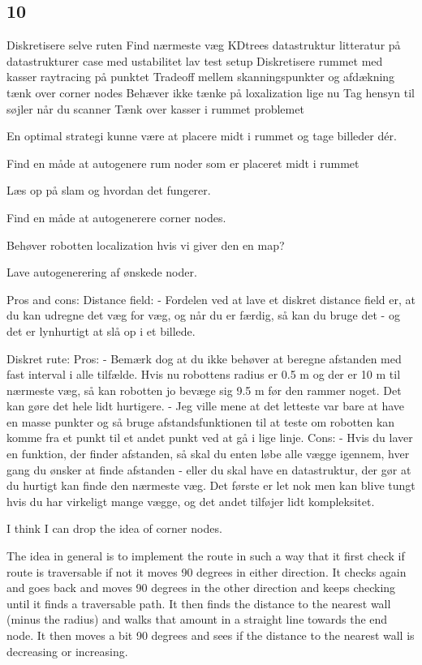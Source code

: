 \subsection{10}
Diskretisere selve ruten
Find nærmeste væg 
KDtrees datastruktur 
litteratur på datastrukturer
case med ustabilitet
lav test setup
Diskretisere rummet med kasser
raytracing på punktet
Tradeoff mellem skanningspunkter og afdækning
tænk over corner nodes
Behæver ikke tænke på loxalization lige nu
Tag hensyn til søjler når du scanner 
Tænk over kasser i rummet problemet

En optimal strategi kunne være at placere midt i rummet og tage billeder dér.

Find en måde at autogenere rum noder som er placeret midt i rummet

Læs op på slam og hvordan det fungerer.

Find en måde at autogenerere corner nodes.

Behøver robotten localization hvis vi giver den en map?

Lave autogenerering af ønskede noder.

Pros and cons: 
Distance field:
- Fordelen ved at lave et diskret distance field er, at du kan udregne det væg for væg, og når du er færdig, så kan du bruge det - og det er lynhurtigt at slå op i et billede.

Diskret rute:
Pros:
- Bemærk dog at du ikke behøver at beregne afstanden med fast interval i alle tilfælde. Hvis nu robottens radius er 0.5 m og der er 10 m til nærmeste væg, så kan robotten jo bevæge sig 9.5 m før den rammer noget. Det kan gøre det hele lidt hurtigere.
- Jeg ville mene at det letteste var bare at have en masse punkter og så bruge afstandsfunktionen til at teste om robotten kan komme fra et punkt til et andet punkt ved at gå i lige linje.
Cons:
- Hvis du laver en funktion, der finder afstanden, så skal du enten løbe alle vægge igennem, hver gang du ønsker at finde afstanden - eller du skal have en datastruktur, der gør at du hurtigt kan finde den nærmeste væg. Det første er let nok men kan blive tungt hvis du har virkeligt mange vægge, og det andet tilføjer lidt kompleksitet.


I think I can drop the idea of corner nodes.

The idea in general is to implement the route in such a way that it first check if route is traversable if not it moves 90 degrees in either direction. It checks again and goes back and moves 90 degrees in the other direction and keeps checking until it finds a traversable path. It then finds the distance to the nearest wall (minus the radius) and walks that amount in a straight line towards the end node. It then moves a bit 90 degrees and sees if the distance to the nearest wall is decreasing or increasing.


